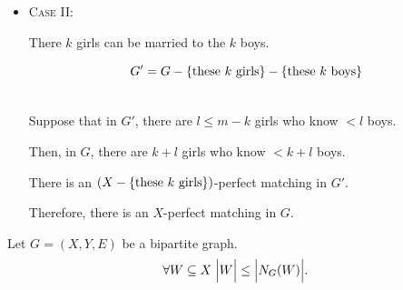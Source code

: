 \begin{frame}{}
  \begin{itemize}
    \item \textsc{Case II:} 

      \begin{center}
        \pause
        \vspace{0.30cm}
        There $k$ girls can be married  to the $k$ boys.

        \pause
        \vspace{0.20cm}

        \pause
        \[
          G' = G - \{\text{these $k$ girls}\} - \{\text{these $k$ boys}\}
        \]

        \pause

        \pause
        \vspace{0.30cm}
         \\[6pt]
        Suppose that in $G'$, there are $l \le m - k$ girls who know $< l$ boys.

        \pause
        \vspace{0.30cm}
        Then, in $G$, there are $k + l$ girls who know $< k + l$ boys.

        \pause
        \vspace{0.50cm}
        There is an $(X - \{\text{these $k$ girls}\})$-perfect matching in $G'$.

        \pause
        \vspace{0.30cm}
        Therefore, there is an $X$-perfect matching in $G$.
      \end{center}
  \end{itemize}
\end{frame}

\begin{frame}{}
  \begin{theorem}
    Let $G = (X, Y, E)$ be a bipartite graph. \\[6pt]

    \[
      \forall W \subseteq X\; \Big\lvert W \Big\rvert \le \Big\lvert N_{G}(W) \Big\rvert.
    \]
  \end{theorem}
\end{frame}

